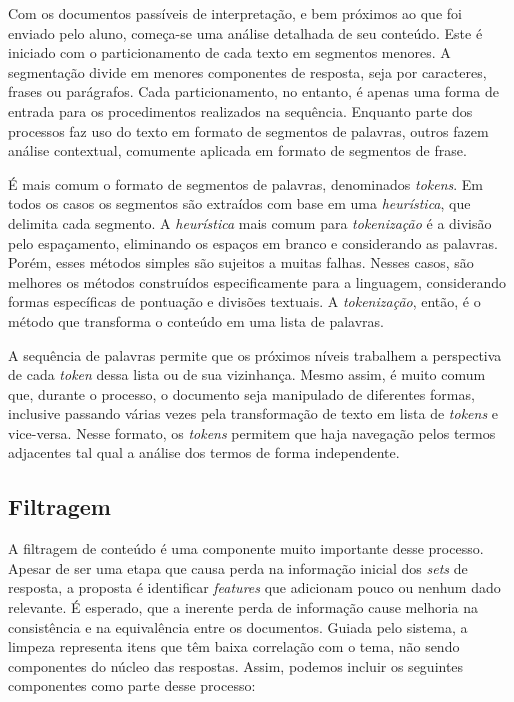 
Com os documentos passíveis de interpretação, e bem próximos ao que foi enviado pelo aluno, começa-se uma análise detalhada de seu conteúdo. Este é iniciado com o particionamento de cada texto em segmentos menores. A segmentação divide em menores componentes de resposta, seja por caracteres, frases ou parágrafos. Cada particionamento, no entanto, é apenas uma forma de entrada para os procedimentos realizados na sequência. Enquanto parte dos processos faz uso do texto em formato de segmentos de palavras, outros fazem análise contextual, comumente aplicada em formato de segmentos de frase.

É mais comum o formato de segmentos de palavras, denominados \textit{tokens}. Em todos os casos os segmentos são extraídos com base em uma \textit{heurística}, que delimita cada segmento. A \textit{heurística} mais comum para \textit{tokenização} é a divisão pelo espaçamento, eliminando os espaços em branco e considerando as palavras. Porém, esses métodos simples são sujeitos a muitas falhas. Nesses casos, são melhores os métodos construídos especificamente para a linguagem, considerando formas específicas de pontuação e divisões textuais. A \textit{tokenização}, então, é o método que transforma o conteúdo em uma lista de palavras.

A sequência de palavras permite que os próximos níveis trabalhem a perspectiva de cada \textit{token} dessa lista ou de sua vizinhança. Mesmo assim, é muito comum que, durante o processo, o documento seja manipulado de diferentes formas, inclusive passando várias vezes pela transformação de texto em lista de \textit{tokens} e vice-versa. Nesse formato, os \textit{tokens} permitem que haja navegação pelos termos adjacentes tal qual a análise dos termos de forma independente.


\subsection{Filtragem}
\label{subsec-filtragem}


A filtragem de conteúdo é uma componente muito importante desse processo. Apesar de ser uma etapa que causa perda na informação inicial dos \textit{sets} de resposta, a proposta é identificar \textit{features} que adicionam pouco ou nenhum dado relevante. É esperado, que a inerente perda de informação cause melhoria na consistência e na equivalência entre os documentos. Guiada pelo sistema, a limpeza representa itens que têm baixa correlação com o tema, não sendo componentes do núcleo das respostas. Assim, podemos incluir os seguintes componentes como parte desse processo:

